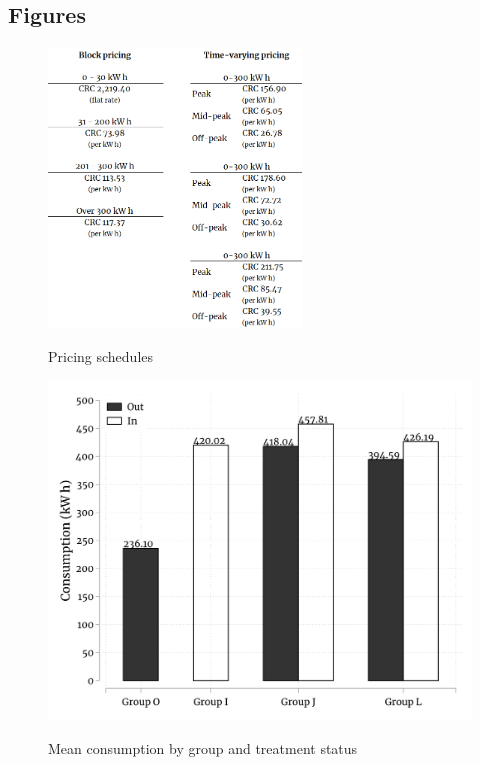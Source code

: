 \clearpage

\subsection{Figures} %


\begin{figure}[ht]
  \caption{Pricing schedules}\label{fig:table1}
  \begin{center}
  {\includegraphics[width=0.6\textwidth]{./figures/table1.png}}
  \end{center}
\end{figure}

\clearpage


\begin{figure}[ht]
  \caption{Mean consumption by group and treatment status}\label{fig:one}
  \begin{center}
  {\includegraphics[width=1\textwidth]{./figures/meansByContractType.png}}
  \end{center}
\end{figure}

